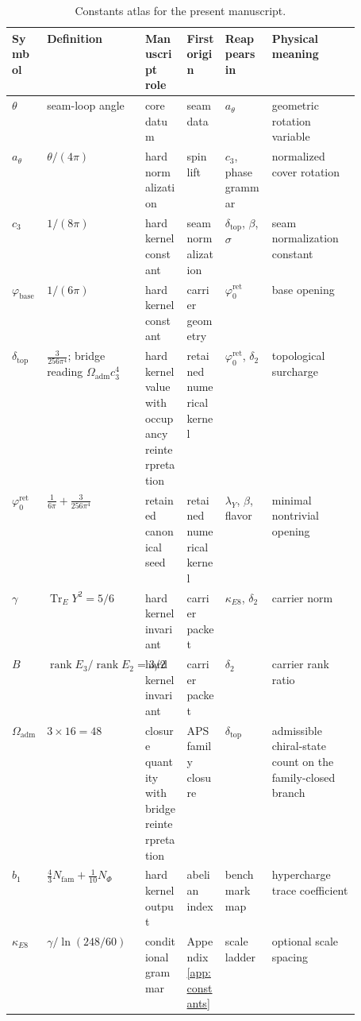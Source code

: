 \documentclass[11pt,a4paper]{article}
\theoremstyle{definition}
\theoremstyle{remark}
\DeclareMathOperator{\tr}{Tr}
\DeclareMathOperator{\rank}{rank}
\newcommand{\cthree}{c_3}
\newcommand{\atheta}{a_\theta}
\newcommand{\phibase}{\varphi_{\mathrm{base}}}
\newcommand{\phiz}{\varphi_0^{\mathrm{ret}}}
\newcommand{\deltatop}{\delta_{\mathrm{top}}}
\newcommand{\bone}{b_1}
\newcommand{\Oadm}{\Omega_{\mathrm{adm}}}
\newcommand{\lambdaY}{\lambda_Y}
\begin{document}
\begin{table}[t]
\centering
\scriptsize
\setlength{\tabcolsep}{3pt}
\begin{tabularx}{\linewidth}{@{}>{\raggedright\arraybackslash}p{0.10\linewidth}>{\raggedright\arraybackslash}p{0.18\linewidth}>{\raggedright\arraybackslash}p{0.12\linewidth}>{\raggedright\arraybackslash}p{0.11\linewidth}YY@{}}
\toprule
Symbol & Definition & Manuscript role & First origin & Reappears in & Physical meaning \\
\midrule
$\theta$ & seam-loop angle & core datum & seam data & $\atheta$ & geometric rotation variable \\
$\atheta$ & $\theta/(4\pi)$ & hard normalization & spin lift & $\cthree$, phase grammar & normalized cover rotation \\
$\cthree$ & $1/(8\pi)$ & hard kernel constant & seam normalization & $\deltatop$, $\beta$, $\sigma$ & seam normalization constant \\
$\phibase$ & $1/(6\pi)$ & hard kernel constant & carrier geometry & $\phiz$ & base opening \\
$\deltatop$ & $\frac{3}{256\pi^4}$; bridge reading $\Oadm\cthree^4$ & hard kernel value with occupancy reinterpretation & retained numerical kernel & $\phiz$, $\delta_2$ & topological surcharge \\
$\phiz$ & $\frac{1}{6\pi}+\frac{3}{256\pi^4}$ & retained canonical seed & retained numerical kernel & $\lambdaY$, $\beta$, flavor & minimal nontrivial opening \\
$\gamma$ & $\tr_EY^2=5/6$ & hard kernel invariant & carrier packet & $\kappa_{E8}$, $\delta_2$ & carrier norm \\
$B$ & $\rank E_3/\rank E_2=3/2$ & hard kernel invariant & carrier packet & $\delta_2$ & carrier rank ratio \\
$\Oadm$ & $3\times16=48$ & closure quantity with bridge reinterpretation & APS family closure & $\deltatop$ & admissible chiral-state count on the family-closed branch \\
$\bone$ & $\frac43N_{\mathrm{fam}}+\frac1{10}N_\Phi$ & hard kernel output & abelian index & benchmark map & hypercharge trace coefficient \\
$\kappa_{E8}$ & $\gamma/\ln(248/60)$ & conditional grammar & Appendix~\ref{app:constants} & scale ladder & optional scale spacing \\
\bottomrule
\end{tabularx}
\caption{Constants atlas for the present manuscript.}
\label{tab:constants-atlas}
\end{table}
\end{document}
